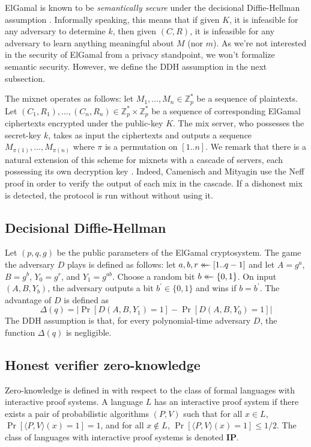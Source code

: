 \documentclass[letter]{article}
\newcommand{\Zmodp}{\mathbb{Z}_p}
\newcommand{\bits}{\{0,1\}}
\newcommand*\by{\times}
\newcommand{\getsr}{\mathrel{\leftarrow\mkern-14mu\leftarrow}}
\newcommand{\brackets}[1]{\langle #1 \rangle}
\newcommand{\class}[1]{\mathbf{#1}}
\newcommand{\pk}{K}
\newcommand{\sk}{k}
\newcommand{\varm}{M}
\newcommand{\varc}{C}
\newcommand{\varr}{R}
\newcommand{\advD}{D}
\begin{document}
ElGamal is known to be \textit{semantically secure} under the
decisional Diffie-Hellman assumption \cite{elgamal84,ty98}. Informally speaking, this
means that if given $\pk$, it is infeasible for any adversary to determine
$\sk$, then given $(C,R)$, it is infeasible for any adversary to
learn anything meaningful about $M$ (nor $m$). As we're not
interested in the security of ElGamal from a privacy standpoint, we won't
formalize semantic security. However, we define the DDH assumption in the next
subsection.

The mixnet operates as follows:
let $\varm_1, \ldots, \varm_n \in \Zmodp^*$ be a sequence of plaintexts.
Let $(\varc_1, \varr_1), \ldots, (\varc_n, \varr_n) \in \Zmodp^* \by \Zmodp^*$ be a
sequence of corresponding ElGamal ciphertexts encrypted under the public-key
$\pk$. The mix server, who possesses the secret-key $\sk$, takes as input
the ciphertexts and outputs a sequence $\varm_{\pi(1)}, \ldots, \varm_{\pi(n)}$
where $\pi$ is a permutation on $[1..n]$.
We remark that there is a natural extension of this scheme for mixnets with a
cascade of servers, each possessing its own decryption key \cite{cm06}. Indeed,
Camenisch and Mityagin use the Neff proof in order to verify the output of each
mix in the cascade. If a dishonest mix is detected, the protocol is run without
without using it.

\subsection{Decisional Diffie-Hellman}

Let $(p, q, g)$ be the public parameters of the ElGamal cryptosystem. The game
the adversary $\advD$ plays is defined as follows: let $a, b, r \getsr
[1..q-1]$ and let $A = g^a$, $B = g^b$, $Y_0 = g^r$, and $Y_1 = g^{ab}$. Choose
a random bit $b \getsr \bits$. On input $(A, B, Y_b)$, the adversary outputs a
bit $b^\prime \in \bits$ and wins if $b=b^\prime$. The advantage of $\advD$ is
defined as
\[
  \Delta(q) = |\Pr[\advD(A, B, Y_1)=1] - \Pr[\advD(A, B, Y_0)=1]|
\]
The DDH assumption is that, for every polynomial-time adversary $\advD$, the
function $\Delta(q)$ is negligible.

\subsection{Honest verifier zero-knowledge}

Zero-knowledge is defined in \cite{goldreich} with respect to the class of
formal languages with interactive proof systems. A language $L$ has an
interactive proof system if there exists a pair of probabilistic algorithms $(P,
V)$ such that for all $x \in L$, $\Pr[\brackets{P, V}(x) = 1] = 1$, and for all
$x \not\in L$, $\Pr[\brackets{P, V}(x) = 1] \le 1/2$. The class of languages
with interactive proof systems is denoted $\class{IP}$.
\end{document}
